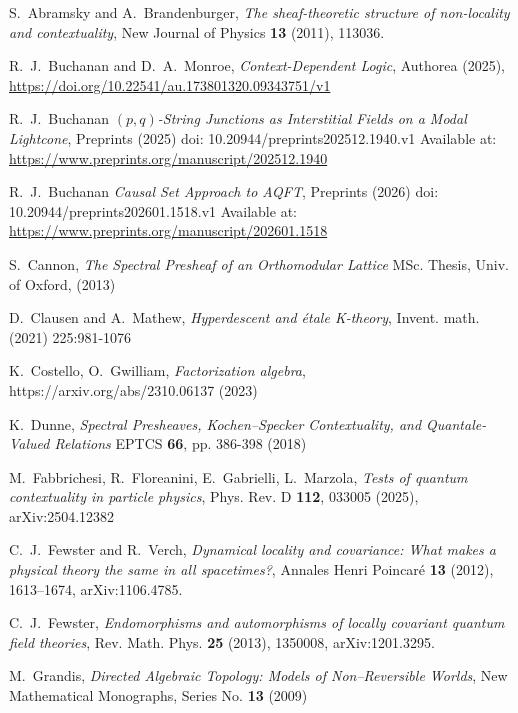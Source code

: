 \documentclass{article}
\numberwithin{tm}{section}
\numberwithin{dn}{section}
\numberwithin{as}{section}
\numberwithin{rk}{section}
\numberwithin{lem}{section}
\numberwithin{ax}{section}
\numberwithin{pp}{section}
\numberwithin{eg}{section}
\numberwithin{war}{section}
\numberwithin{equation}{section}
\numberwithin{prop}{section}
\numberwithin{nt}{section}
\numberwithin{rc}{section}
\begin{document}
\begin{thebibliography}{9}
	S.~Abramsky and A.~Brandenburger,
	\emph{The sheaf-theoretic structure of non-locality and contextuality},
	New Journal of Physics \textbf{13} (2011), 113036.
	
	R.~J.~Buchanan and D.~A.~Monroe,
	\emph{Context-Dependent Logic},
	Authorea (2025), \url{https://doi.org/10.22541/au.173801320.09343751/v1}
	
	R.~J.~Buchanan
	\emph{$(p,q)$-String Junctions as Interstitial Fields on a Modal Lightcone},
	Preprints (2025) doi: 10.20944/preprints202512.1940.v1
	 Available at: \url{https://www.preprints.org/manuscript/202512.1940}
	 
	 R.~J.~Buchanan
	 \emph{Causal Set Approach to AQFT},
	 Preprints (2026) doi: 10.20944/preprints202601.1518.v1
	 Available at: \url{https://www.preprints.org/manuscript/202601.1518}
	
	S.~Cannon,
	\emph{The Spectral Presheaf of an Orthomodular Lattice}
	MSc. Thesis, Univ. of Oxford, (2013)
	
	D.~Clausen and A.~Mathew,
	\emph{Hyperdescent and étale K-theory},
	Invent. math. (2021) 225:981-1076
	
	K.~Costello, O.~Gwilliam,
	\emph{Factorization algebra},
	https://arxiv.org/abs/2310.06137 (2023)
	
	K.~Dunne,
	\emph{Spectral Presheaves, Kochen--Specker Contextuality, and Quantale-Valued Relations}
	EPTCS \textbf{66}, pp. 386-398 (2018)
	
	M.~Fabbrichesi, R.~Floreanini, E.~Gabrielli, L.~Marzola,
	\emph{Tests of quantum contextuality in particle physics},
	Phys. Rev. D \textbf{112}, 033005 (2025),
		arXiv:2504.12382
	
	C.~J.~Fewster and R.~Verch,
	\emph{Dynamical locality and covariance: What makes a physical theory the same in all spacetimes?},
	Annales Henri Poincar{\'e} \textbf{13} (2012), 1613--1674,
	arXiv:1106.4785.
	
	C.~J.~Fewster,
	\emph{Endomorphisms and automorphisms of locally covariant quantum field theories},
	Rev. Math. Phys. \textbf{25} (2013), 1350008,
	arXiv:1201.3295.
	
	M.~Grandis,
	\emph{Directed Algebraic Topology: Models of Non--Reversible Worlds},
	New Mathematical Monographs, Series No. \textbf{13} (2009)
	

\end{thebibliography}
\end{document}
